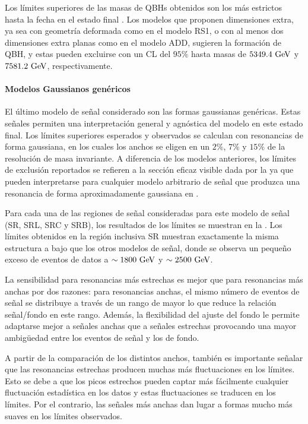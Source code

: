Los límites superiores de las masas de \acp{QBH} obtenidos son los más estrictos hasta la fecha en el estado final \gammajet. Los modelos que proponen dimensiones extra, ya sea con geometría deformada como en el modelo RS1, o con al menos dos dimensiones extra planas como en el modelo ADD, sugieren la formación de \ac{QBH}, y estas pueden excluirse con un \ac{CL} del \(95\%\) hasta masas de \(5349.4~\text{GeV}\) y \(7581.2~\text{GeV}\), respectivamente.




\paragraph{Modelos Gaussianos genéricos}
\label{paragraph:results:results:bkgsig:results:gaus}


El último modelo de señal considerado son las formas gaussianas genéricas. Estas señales permiten una interpretación general y agnóstica del modelo en este estado final. Los límites superiores esperados y observados se calculan con resonancias de forma gaussiana, en los cuales los anchos se eligen en un \(2\%\), \(7\%\) y \(15\%\) de la resolución de masa invariante. A diferencia de los modelos anteriores, los límites de exclusión reportados se refieren a la sección eficaz visible dada por la \Eqn{\ref{eq:results:results:bkgsig:results:visible_xs}} ya que pueden interpretarse para cualquier modelo arbitrario de señal que produzca una resonancia \gammajet de forma aproximadamente gaussiana en \myj.

Para cada una de las regiones de señal consideradas para este modelo de señal (SR, SRL, SRC y SRB), los resultados de los límites se muestran en la \Fig{\ref{fig:results:results:bkgsig:results:gaus:limits}}.
Los límites obtenidos en la región inclusiva SR muestran exactamente la misma estructura a bajo \myj que los otros modelos de señal, donde se observa un pequeño exceso de eventos de datos a \(\sim 1800~\text{GeV}\) y \(\sim 2500~\text{GeV}\).

La sensibilidad para resonancias más estrechas es mejor que para resonancias más anchas por dos razones: para resonancias anchas, el mismo número de eventos de señal se distribuye a través de un rango de \myj mayor lo que reduce la relación señal/fondo en este rango. Además, la flexibilidad del ajuste del fondo le permite adaptarse mejor a señales anchas que a señales estrechas provocando una mayor ambigüedad entre los eventos de señal y los de fondo.

A partir de la comparación de los distintos anchos, también es importante señalar que las resonancias estrechas producen muchas más fluctuaciones en los límites. Esto se debe a que los picos estrechos pueden captar más fácilmente cualquier fluctuación estadística en los datos y estas fluctuaciones se traducen en los límites. Por el contrario, las señales más anchas dan lugar a formas mucho más suaves en los límites observados.

